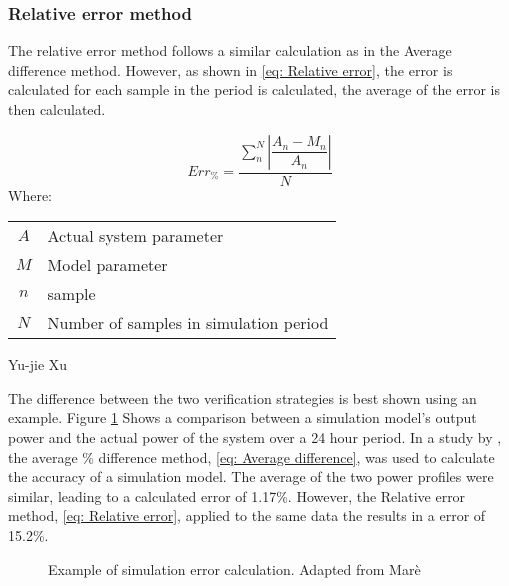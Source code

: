  		\subsubsection{Relative error method}
 		The relative error method follows a similar calculation as in the Average difference method. However, as shown in \cref{eq: Relative error}, the error is calculated for each sample in the period is calculated, the average of the error is then calculated.
 			
 			\begin{equation}
 			\label{eq: Relative error}
 			Err_{\%} = \dfrac{\sum_{n}^{N}{\left|\dfrac{A_{n} - M_{n}}{A_{n}}\right| }}{N}
 			\end{equation}
 			Where: 
 			\begin{table}[h!]
 				\centering
 				\begin{tabular}{cl}
 					$A$ & Actual system parameter \\
 					$M$ & Model parameter \\
 					$n$ & sample \\
 					$N$ & Number of samples in simulation period \\
 				\end{tabular} 
 			\end{table}	
 		Yu-jie Xu \cite{xu2016modeling}
 		\par 
 		The difference between the two verification strategies is best shown using an example. Figure \cref{fig:Philipp Difference verify} Shows a comparison between a simulation model's output power and the actual power of the system over a 24 hour period. In a study by \cite{Mare2016PhD}, the average \% difference method, \cref{eq: Average difference}, was used to calculate the accuracy of a simulation model. The average of the two power profiles were similar, leading to a calculated error of 1.17\%. However, the Relative error method, \cref{eq: Relative error}, applied to the same data the results in a error of 15.2\%. 
 		
 	\begin{figure}[h!]
 		\centering
 		
 		\caption[Example of simulation error calculation.]{Example of simulation error calculation. Adapted from Marè \cite{Mare2016PhD}}
 		\label{fig:Philipp Difference verify}
 	\end{figure}
 

